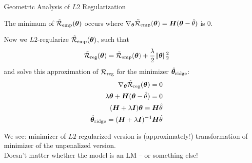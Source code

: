 \documentclass[11pt,compress,t,notes=noshow, xcolor=table]{beamer}
\begin{document}
\begin{vbframe}{Geometric Analysis of $L2$ Regularization}

\normalsize

The minimum of $\mathcal{\tilde R}_{\text{emp}}(\bm{\theta})$ occurs where $\nabla_{\bm{\theta}}\mathcal{\tilde R}_{\text{emp}}(\bm{\theta}) = \bm{H}(\bm{\theta} - \hat{\theta})$ is $0$.

Now we $L2$-regularize $\mathcal{\tilde R}_{\text{emp}}(\bm{\theta})$, such that 
\[
\mathcal{\tilde R}_{\text{reg}}(\bm{\theta}) = \mathcal{\tilde R}_{\text{emp}}(\bm{\theta}) + \frac{\lambda}{2} \|\bm{\theta}\|^2_2\]
and solve this approximation of $\mathcal{R}_{\text{reg}}$ for the minimizer $\hat{\bm{\theta}}_{\text{ridge}}$:
\begin{align*}
 \nabla_{\bm{\theta}}\mathcal{\tilde R}_{\text{reg}}(\bm{\theta}) = 0\\
  \lambda \bm{\theta} + \bm{H}(\bm{\theta} - \hat{\theta}) = 0\\
      (\bm{H} + \lambda \bm{I}) \bm{\theta} = \bm{H} \hat{\theta}\\
      \hat{\bm{\theta}}_{\text{ridge}} = (\bm{H} + \lambda \bm{I})^{-1}\bm{H} \hat{\theta}
\end{align*}

We see: minimizer of $L2$-regularized version is (approximately!) transformation of minimizer of the unpenalized version.\\
Doesn't matter whether the model is an LM -- or something else!
\vspace{0.2cm}



\end{vbframe}
\end{document}
